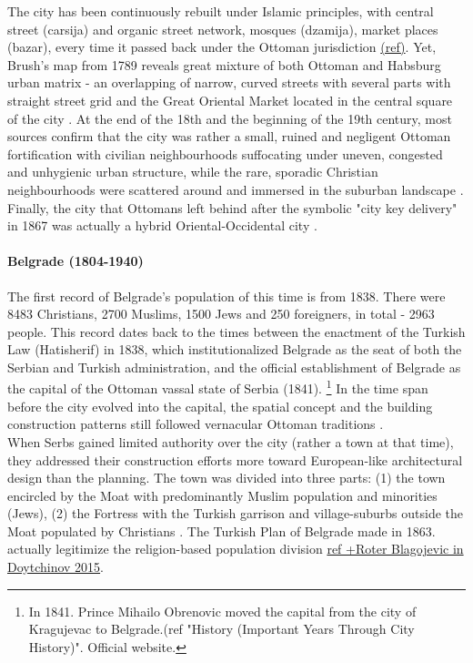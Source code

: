 \documentclass[11pt]{report}
\begin{document}
The city has been continuously rebuilt under Islamic principles, with central street (carsija) and organic street network, mosques (dzamija), market places (bazar), every time it passed back under the Ottoman jurisdiction \href{ref}{(ref)}.
Yet, Brush’s map from 1789 reveals great mixture of both Ottoman and Habsburg urban matrix - an overlapping of narrow, curved streets with several parts with straight street grid and the Great Oriental Market located in the central square of the city \href{ref}{\citealt{doytchinov_modernization_2015}}.
At the end of the 18th and the beginning of the 19th century, most sources confirm that the city was rather a small, ruined and negligent Ottoman fortification with civilian neighbourhoods suffocating under uneven, congested and unhygienic urban structure, while the rare, sporadic Christian neighbourhoods were scattered around and immersed in the suburban landscape \href{ref}{\citealt{doytchinov_modernization_2015}}.
Finally, the city that Ottomans left behind after the symbolic "city key delivery" in 1867 was actually a hybrid Oriental-Occidental city \href{ref}{\citealt{blagojevic_urban_2009}}.

\paragraph{Belgrade (1804-1940)}

The first record of Belgrade’s population of this time is from 1838.
There were 8483 Christians, 2700 Muslims, 1500 Jews and 250 foreigners, in total - 2963 people.
This record dates back to the times between the enactment of the Turkish Law (Hatisherif) in 1838, which institutionalized Belgrade as the seat of both the Serbian and Turkish administration, and the official establishment of Belgrade as the capital of the Ottoman vassal state of Serbia (1841).
\footnote{In 1841. Prince Mihailo Obrenovic moved the capital from the city of Kragujevac to Belgrade.(ref "History (Important Years Through City History)". Official website.}
In the time span before the city evolved into the capital, the spatial concept and the building construction patterns still followed vernacular Ottoman traditions \href{ref}{\citealt{doytchinov_modernization_2015}}.
\\

When Serbs gained limited authority over the city (rather a town at that time), they addressed their construction efforts more toward European-like architectural design than the planning. The town was divided into three parts: (1) the town encircled by the Moat with predominantly Muslim population and minorities (Jews),
(2) the Fortress with the Turkish garrison and village-suburbs outside the Moat populated by Christians \href{ref}{\citealt{blagojevic_urban_2009}}.
The Turkish Plan of Belgrade made in 1863. actually legitimize the religion-based population division \href{ref}{ref +Roter Blagojevic in Doytchinov 2015}.
\\
\end{document}
